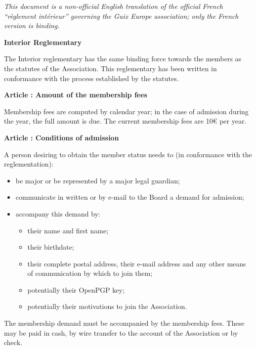 \documentclass [11pt]{article}
\renewcommand {\section}[1]{\stepcounter {section}%
{\vspace {1em}\noindent\Large \bf Article \thesection: #1 \par}}
\begin{document}
\textit {
This document is a non-official English translation of the official French
``règlement intérieur'' governing the Guix Europe association; only the
French version is binding.
}

\begin {center}
\bf \huge {Interior Reglementary}
\end {center}

The Interior reglementary has the same binding force towards the members
as the statutes of the Association. This reglementary has been written
in conformance with the process established by the statutes.


\section {Amount of the membership fees}

Membership fees are computed by calendar year; in the case of admission
during the year, the full amount is due.
The current membership fees are 10€ per year.


\section {Conditions of admission}

A person desiring to obtain the member status needs to (in conformance
with the reglementation):
\begin {itemize}
\item
be major or be represented by a major legal guardian;
\item
communicate in written or by e-mail to the Board a demand for admission;
\item
accompany this demand by:
\begin {itemize}
\item
their name and first name;
\item
their birthdate;
\item
their complete postal address, their e-mail address and any other
means of communication by which to join them;
\item
potentially their OpenPGP key;
\item
potentially their motivations to join the Association.
\end {itemize}
\end {itemize}

The membership demand must be accompanied by the membership fees.
These may be paid in cash, by wire transfer to the account of the
Association or by check.
\end{document}

